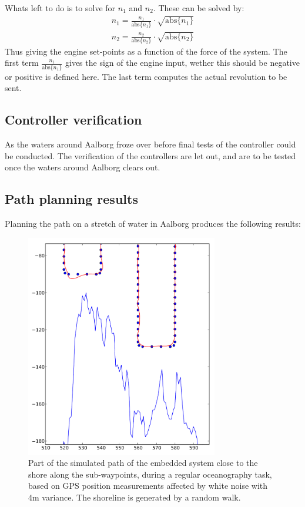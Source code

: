\documentclass{ifacconf}
\begin{document}
Whats left to do is to solve for $n_1$ and $n_2$. These can be solved by:
\begin{align}
n_1 = \frac{n_1}{\text{abs}\{n_1\}} \cdot \sqrt{\text{abs}\{n_1\}}\\
n_2 = \frac{n_2}{\text{abs}\{n_2\}} \cdot \sqrt{\text{abs}\{n_2\}}
\end{align}
Thus giving the engine set-points as a function of the force of the system. The first term $\frac{n_1}{\text{abs}\{n_1\}}$ gives the sign of the engine input, wether this should be negative or positive is defined here. The last term computes the actual revolution to be sent. 


\subsection{Controller verification}
As the waters around Aalborg froze over before final tests of the controller could be conducted. The verification of the controllers are let out, and are to be tested once the waters around Aalborg clears out. 

\subsection{Path planning results}
Planning the path on a stretch of water in Aalborg produces the following results:
\begin{figure}
	\begin{center}
		\includegraphics[width=8.4cm]{img/Navi}    %
		\caption{Part of the simulated path of the embedded system close to the shore along the sub-waypoints, during a regular oceanography task, based on GPS position measurements affected by white noise with 4m variance. The shoreline is generated by a random walk.}  %
		\label{fig:navi}               
	\end{center}                                 %
\end{figure}
\end{document}
